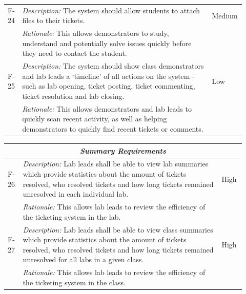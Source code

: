 \documentclass[a4paper,11pt]{article}
\begin{document}
\begin{table}[H]
\begin{tabular}{|p{0.05\linewidth} | p{0.78\linewidth} |p{0.09\linewidth}|}
      \hline\hline
 F-24 & \textit{Description:} The system should allow students to attach files to their tickets. & Medium\\
  \cline{2-2}
  & \textit{Rationale:} This allows demonstrators to study, understand and potentially solve issues quickly before they need to contact the student. & \\
  
        \hline\hline
 F-25 & \textit{Description:} The system should show class demonstrators and lab leads a `timeline' of all actions on the system - such as lab opening, ticket posting, ticket commenting, ticket resolution and lab closing. & Low\\
  \cline{2-2}
  & \textit{Rationale:} This allows demonstrators and lab leads to quickly scan recent activity, as well as helping demonstrators to quickly find recent tickets or comments. & \\
  \hline
 
 \end{tabular}
\end{table}
 
 \begin{table}[H]
\small
\begin{tabular}{|p{0.05\linewidth} | p{0.78\linewidth} |p{0.09\linewidth}|}
 
  \multicolumn{3}{c}{\textit{\textbf{Summary Requirements}}}\\
 
 \hline
 F-26 & \textit{Description:} Lab leads shall be able to view lab summaries which provide statistics about the amount of tickets resolved, who resolved tickets and how long tickets remained unresolved in each individual lab. & High\\
  \cline{2-2}
  & \textit{Rationale:} This allows lab leads to review the efficiency of the ticketing system in the lab. & \\

 \hline\hline
 F-27 & \textit{Description:} Lab leads shall be able to view class summaries which provide statistics about the amount of tickets resolved, who resolved tickets and how long tickets remained unresolved for all labs in a given class. & High\\
  \cline{2-2}
  & \textit{Rationale:} This allows lab leads to review the efficiency of the ticketing system in the class. & \\
  \hline
  
\end{tabular}
\end{table}
\end{document}
